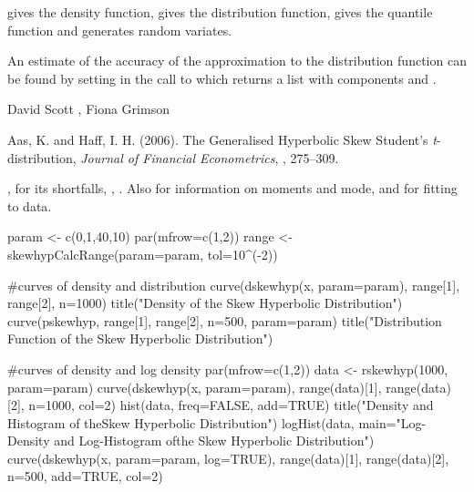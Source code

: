 \begin{Value}
 gives the density function,  gives the
distribution function,  gives the quantile function and
 generates random variates.

An estimate of the accuracy of the approximation to the distribution
function can be found by setting  in the call to
 which returns a list with components  and
.
\end{Value}
\begin{Author}\relax
David Scott , Fiona Grimson
\end{Author}
\begin{References}\relax
Aas, K. and Haff, I. H. (2006).
The Generalised Hyperbolic Skew Student's \emph{t}-distribution,
\emph{Journal of Financial Econometrics}, , 275--309.
\end{References}
\begin{SeeAlso}\relax
{},  for
its shortfalls, ,
. Also 
for information on moments and mode, and  for
fitting to data.
\end{SeeAlso}
\begin{Examples}
\begin{ExampleCode}
param <- c(0,1,40,10)
par(mfrow=c(1,2))
range <- skewhypCalcRange(param=param, tol=10^(-2))

#curves of density and distribution
curve(dskewhyp(x, param=param), range[1], range[2], n=1000)
title("Density of the \n Skew Hyperbolic Distribution")
curve(pskewhyp, range[1], range[2], n=500, param=param)
title("Distribution Function of the \n Skew Hyperbolic Distribution")

#curves of density and log density
par(mfrow=c(1,2))
data <- rskewhyp(1000, param=param)
curve(dskewhyp(x, param=param), range(data)[1], range(data)[2],
      n=1000, col=2)
hist(data, freq=FALSE, add=TRUE)
title("Density and Histogram of the\n Skew Hyperbolic Distribution")
logHist(data, main="Log-Density and Log-Histogram of\n the Skew
      Hyperbolic Distribution")
curve(dskewhyp(x, param=param, log=TRUE), range(data)[1], range(data)[2],
      n=500, add=TRUE, col=2)

\end{ExampleCode}
\end{Examples}

